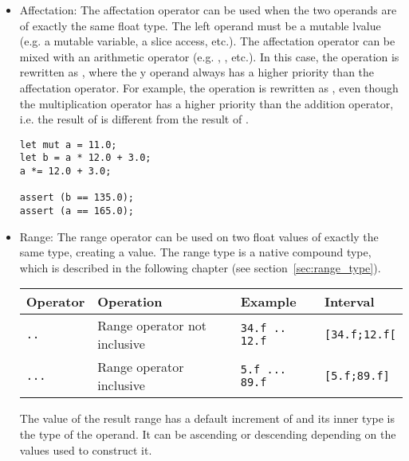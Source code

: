 \begin{itemize}
\item Affectation: The affectation operator \token{=} can be used when the two
  operands are of exactly the same float type. The left operand must be a
  mutable lvalue (e.g. a mutable variable, a slice access, etc.). The
  affectation operator can be mixed with an arithmetic operator (e.g.
  \token{+=}, \token{/=}, etc.). In this case, the operation 
  is rewritten as , where the y operand always has a higher
  priority than the affectation operator. For example, the operation  is rewritten as , even though the
  multiplication operator has a higher priority than the addition operator, i.e.
  the result of  is different from the result of
  .

  \begin{lstlisting}[style=coloredverbatim]
let mut a = 11.0;
let b = a * 12.0 + 3.0;
a *= 12.0 + 3.0;

assert (b == 135.0);
assert (a == 165.0);
  \end{lstlisting}

\item Range: The range operator can be used on two float values of exactly the
  same type, creating a  value. The range type is a native
  compound type, which is described in the following chapter (see
  section~\ref{sec:range_type}).

  \begin{center}
    \vspace{-20pt}
    \begin{adjustbox}{max width=1.0\linewidth}
      \begin{tabular}{|l|lll|}
        \hline
        Operator & Operation & Example & Interval\\[0pt]
        \hline
        \hline
        \texttt{..} & Range operator not inclusive & \texttt{34.f .. 12.f} & \texttt{[34.f;12.f[}\\[0pt]
            \texttt{...} & Range operator inclusive & \texttt{5.f ... 89.f} & \texttt{[5.f;89.f]}\\[0pt]
            \hline
      \end{tabular}
    \end{adjustbox}
  \end{center}


  The value of the result range has a default increment of  and its
  inner type is the type of the operand. It can be ascending or descending
  depending on the values used to construct it.

\end{itemize}

